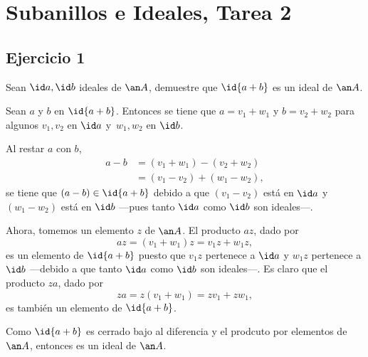 \documentclass[twocolumn,tarea]{customclass}
\begin{document}
\chapter{Subanillos e Ideales, Tarea 2}
\section*{Ejercicio 1}
 Sean $\id a,\id b$ ideales de $\an A$, demuestre que $\id{a+b}$ es un ideal de $\an A$. 
\begin{sol}
Sean $a$ y $b$ en $\id{a+b}$. Entonces se tiene que $a = v_1 + w_1$ y $b = v_2 + w_2$ para algunos $v_1,v_2$ en $\id a$ y $\, w_1,w_2$ en $\id b$. 

Al restar $a$ con $b$,
\begin{align*}
a-b &= (v_1 + w_1) - (v_2 + w_2) \\ &= (v_1-v_2) + (w_1-w_2),
\end{align*}
se tiene que $(a-b) \in\id{a+b}$ debido a que $(v_1-v_2) $ está en $\id a$ y $(w_1-w_2) $ está en $\id b$ ---pues tanto $\id a$ como $\id b$ son ideales---.

Ahora, tomemos un elemento $z$ de $\an A$. El producto $az$, dado por
\[ az = (v_1 + w_1)z = v_1z + w_1z, \]
es un elemento de $\id{a+b}$ puesto que $v_1z$ pertenece a $\id a$ y $w_1z$ pertenece a $\id b$ ---debido a que tanto $\id a$ como $\id b$ son ideales---. Es claro que el producto $za$, dado por
\[ za = z(v_1 + w_1) = zv_1 + zw_1, \]
es también un elemento de $\id{a+b}$.

Como $\id{a+b}$ es cerrado bajo al diferencia y el prodcuto por elementos de $\an A$, entonces es un ideal de $\an A$.

\end{sol}
\end{document}
